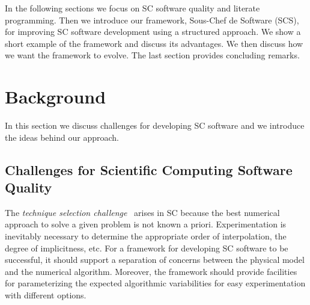 \documentclass{sig-alternate-05-2015}
\begin{document}
In the following sections we  
focus on SC software quality and literate
programming.
Then we introduce our framework, Sous-Chef de Software (SCS), 
for improving SC software development using a structured approach.  We show
a short example of the framework and discuss its advantages. 
We then discuss how we want the framework to evolve. %
The last section provides concluding remarks.

\section{Background} \label{sec:background}

In this section we discuss challenges for developing SC software and we
introduce the ideas behind our approach.

\subsection{Challenges for Scientific Computing Software
  Quality} \label{ssec:challenges}


The \textit{technique selection challenge}~\cite{Yu2011} arises in SC because
the best numerical approach to solve a given problem is not known a priori.
Experimentation is inevitably necessary to determine the
appropriate order of interpolation, the degree of implicitness, etc. For a
framework for developing SC software to be successful, it should support
a separation of concerns between the physical model and the numerical algorithm.
Moreover, the framework should provide facilities for parameterizing the
expected algorithmic variabilities for easy experimentation with different
options.
\end{document}
